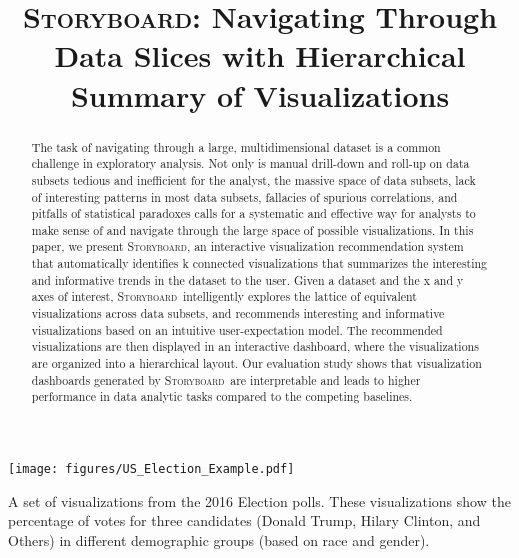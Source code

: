 \documentclass[sigchi, review]{acmart}
\newcommand{\system}{\textsc{Storyboard}\xspace}
\def\plainauthor{Doris Jung-Lin Lee*, Himel Dev*, Huizi Hu, Hazem Elmeleegy, Aditya Parameswaran}
\begin{document}
\title{\system : Navigating Through Data Slices with Hierarchical Summary of Visualizations}
\begin{abstract}
The task of navigating through a large, multidimensional dataset is a common challenge in exploratory analysis. Not only is manual drill-down and roll-up on data subsets tedious and inefficient for the analyst, the massive space of data subsets, lack of interesting patterns in most data subsets, fallacies of spurious correlations, and pitfalls of statistical paradoxes calls for a systematic and effective way for analysts to make sense of and navigate through the large space of possible visualizations. In this paper, we present \system, an interactive visualization recommendation system that automatically identifies k connected visualizations that summarizes the interesting and informative trends in the dataset to the user. Given a dataset and the x and y axes of interest, \system\ intelligently explores the lattice of equivalent visualizations across data subsets, and recommends interesting and informative visualizations based on an intuitive user-expectation model. The recommended visualizations are then displayed in an interactive dashboard, where the visualizations are organized into a hierarchical layout. Our evaluation study shows that visualization dashboards generated by \system\ are interpretable and leads to higher performance in data analytic tasks compared to the competing baselines.
\end{abstract}
\begin{teaserfigure}
  \centering
  \texttt{[image: figures/US\_Election\_Example.pdf]}
  \caption{A set of visualizations from the 2016 Election polls. These visualizations show the percentage of votes for three candidates (Donald Trump, Hilary Clinton, and Others) in different demographic groups (based on race and gender).}
  \label{fig:elections_example}
\end{teaserfigure}

\maketitle












\end{document}
